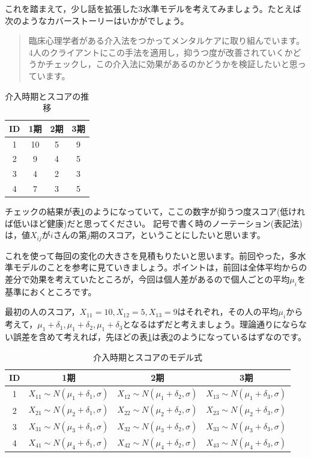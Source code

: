\documentclass{ltjsbook}
\begin{document}
これを踏まえて，少し話を拡張した3水準モデルを考えてみましょう。たとえば次のようなカバーストーリーはいかがでしょう。
\begin{quote}
	臨床心理学者がある介入法をつかってメンタルケアに取り組んでいます。
	4人のクライアントにこの手法を適用し，抑うつ度が改善されていくかどうかチェックし，この介入法に効果があるのかどうかを検証したいと思っています。
\end{quote}
\begin{table}[ht]
	\centering
	\caption{介入時期とスコアの推移}
	\begin{tabular}{cccc}
		ID & 1期 & 2期 & 3期 \\\hline
		1  & 10 & 5  & 9  \\
		2  & 9  & 4  & 5  \\
		3  & 4  & 2  & 3  \\
		4  & 7  & 3  & 5  \\\hline
	\end{tabular}
	\label{tbl:09_02}
\end{table}
チェックの結果が表\ref{tbl:09_02}のようになっていて，ここの数字が抑うつ度スコア(低ければ低いほど健康)だと思ってください。
記号で書く時のノーテーション(表記法)は，値$X_{ij}$が$i$さんの第$j$期のスコア，ということにしたいと思います。

これを使って毎回の変化の大きさを見積もりたいと思います。前回やった，多水準モデルのことを参考に見ていきましょう。ポイントは，前回は全体平均からの差分で効果を考えていたところが，今回は個人差があるので個人ごとの平均$\mu_i$を基準におくところです。

最初の人のスコア，$X_{11}=10,X_{12}=5,X_{13}=9$はそれぞれ，その人の平均$\mu_i$から考えて，$\mu_1+\delta_1,\mu_1+\delta_2,\mu_1+\delta_3$となるはずだと考えましょう。理論通りにならない誤差を含めて考えれば，先ほどの表\ref{tbl:09_02}は表\ref{tbl:09_03}のようになっているはずなのです。
\begin{table}[ht]
	\centering
	\caption{介入時期とスコアのモデル式}
	\begin{tabular}{cccc}
		ID & 1期                                    & 2期                                    & 3期                                    \\\hline
		1  & $X_{11}\sim N(\mu_1+\delta_1,\sigma)$ & $X_{12}\sim N(\mu_1+\delta_2,\sigma)$ & $X_{13}\sim N(\mu_1+\delta_3,\sigma)$ \\
		2  & $X_{21}\sim N(\mu_2+\delta_1,\sigma)$ & $X_{22}\sim N(\mu_2+\delta_2,\sigma)$ & $X_{23}\sim N(\mu_2+\delta_3,\sigma)$ \\
		3  & $X_{31}\sim N(\mu_3+\delta_1,\sigma)$ & $X_{32}\sim N(\mu_3+\delta_2,\sigma)$ & $X_{33}\sim N(\mu_3+\delta_3,\sigma)$ \\
		4  & $X_{41}\sim N(\mu_4+\delta_1,\sigma)$ & $X_{42}\sim N(\mu_4+\delta_2,\sigma)$ & $X_{43}\sim N(\mu_4+\delta_3,\sigma)$ \\\hline
	\end{tabular}
	\label{tbl:09_03}
\end{table}
\end{document}

